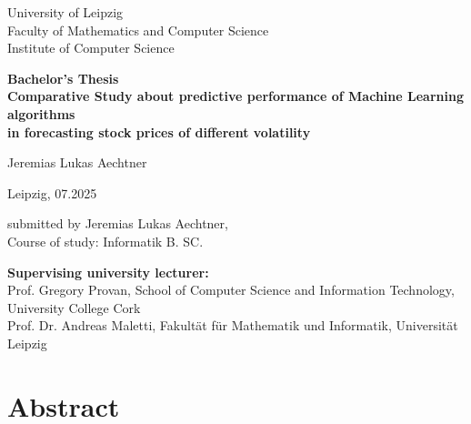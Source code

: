 \documentclass[a4paper,12pt]{report}
\begin{document}
\thispagestyle{empty}

\begin{center}
  \large
University of Leipzig\\
Faculty of Mathematics and Computer Science\\[0.3cm]
Institute of Computer Science
\end{center}

\vspace{3cm}

\begin{center}
  \LARGE\bfseries
  Bachelor's Thesis\\[1cm]
  Comparative Study about predictive performance of Machine Learning algorithms\\
  in forecasting stock prices of different volatility
\end{center}

\vspace{3cm}

\begin{center}
  \large
  Jeremias Lukas Aechtner
\end{center}

\vfill

\noindent
\begin{minipage}[t]{0.5\textwidth}
  Leipzig, 07.2025
\end{minipage}%
\begin{minipage}[t]{0.5\textwidth}
  \raggedleft
  submitted by Jeremias Lukas Aechtner,\\
  Course of study: Informatik B. SC.
\end{minipage}

\vspace{2cm}

\noindent
\begin{minipage}[t]{\textwidth}
  \small
  \textbf{Supervising university lecturer:}\\
  Prof. Gregory Provan, School of Computer Science and Information Technology, University College Cork\\
  Prof. Dr. Andreas Maletti, Fakultät für Mathematik und Informatik, Universität Leipzig
\end{minipage}


\chapter*{Abstract}
\end{document}
